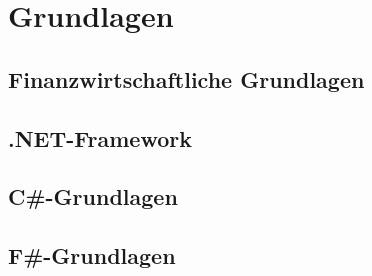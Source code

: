 
\chapter{Grundlagen} \label{chapter:grundlagen}


\section{Finanzwirtschaftliche Grundlagen}


\section{.NET-Framework}



\section{C\#-Grundlagen}









\section{F\#-Grundlagen}

